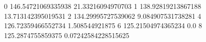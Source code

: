0 146.54721069335938 21.33216094970703
1 138.92819213867188 13.713142395019531
2 134.29995727539062 9.084907531738281
4 126.72359466552734 1.508544921875
6 125.21504974365234 0.0
8 125.2874755859375 0.07242584228515625
